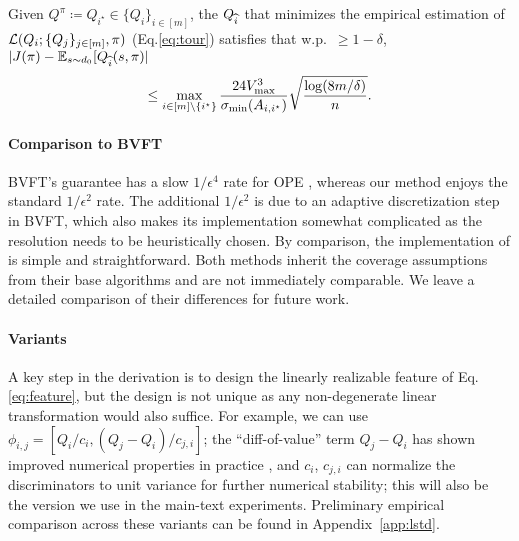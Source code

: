 \begin{theorem}\label{thm:tournament}
Given $Q^\pi\coloneqq Q_{i^\star} \in \{Q_i\}_{i\in[m]}$, the $Q_{\widehat{i}}$ that minimizes the empirical estimation of $\mathcal{L}(Q_i; \{Q_j\}_{j\in[m]}, \pi)$ (Eq.\eqref{eq:tour}) satisfies that w.p.~$\ge 1-\delta$, $|J(\pi) - \mathbb{E}_{s\sim d_0}[Q_{\widehat{i}}(s, \pi)| $%
\begin{align}
\le\max_{i \in [m] \setminus \{i^\star\}}\frac{ 24 V_{\max}^3}{\sigma_{\min}(A_{i,i^\star})}\sqrt{\frac{\log(8m/\delta)}{n}}.
\end{align}
%
\end{theorem}

\begin{comment}
\begin{proof}
    \[
|J_{M^\star}(\pi) - \EE_{s\sim d_0}[Q_{\emp i}(s, \pi)| \leq \nrm{Q^\pi - Q_{\hat{i}}}_\infty
    \]

    
\end{proof}
\end{comment}

\paragraph{Comparison to BVFT \cite{xie2020batch}} BVFT's guarantee has a slow $1/\epsilon^4$ rate for OPE \cite{zhang2021towards, jia2024offline}, whereas our method enjoys the standard $1/\epsilon^2$ rate. The additional $1/\epsilon^2$ is due to an adaptive discretization step in BVFT, which also makes its implementation somewhat complicated as the resolution needs to be heuristically chosen. By comparison, the implementation of \lstd is simple and straightforward. Both methods inherit the coverage assumptions from their base algorithms and are not immediately comparable. We leave a detailed comparison of their differences for future work.

\paragraph{Variants} A key step in the derivation is to design the linearly realizable feature of Eq.\eqref{eq:feature}, but the design is not unique as any non-degenerate linear transformation would also suffice. For example, we can use $\phi_{i,j} = [Q_i/c_i, (Q_j-Q_i)/c_{j,i}]$; the ``diff-of-value'' term $Q_j -Q_i$ has shown improved numerical properties in practice \cite{kumar2020conservative, cheng2022adversarially}, and $c_i$, $c_{j,i}$ can normalize the discriminators to unit variance for further numerical stability; this will also be the version we use in the main-text experiments. %
Preliminary empirical comparison across these variants can be found in  Appendix~\ref{app:lstd}.


